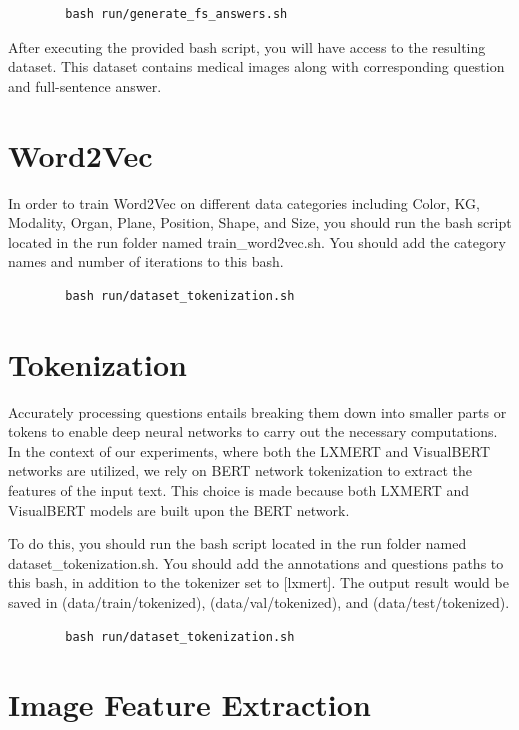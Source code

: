 \documentclass{adonis}
\begin{document}
        \begin{verbatim}
        bash run/generate_fs_answers.sh
        \end{verbatim}

        
  After executing the provided bash script, you will have access to the resulting dataset.  This dataset contains medical images along with corresponding question and full-sentence answer. 


\section{Word2Vec}
	
        In order to train Word2Vec on different data categories including Color, KG, Modality, Organ, Plane, Position, Shape, and Size, you should run the bash script located in the run folder named train\_word2vec.sh. You should add the category names and number of iterations to this bash. 
        \begin{verbatim}
        bash run/dataset_tokenization.sh
        \end{verbatim}

		
		\section{Tokenization}

        Accurately processing questions entails breaking them down into smaller parts or tokens to enable deep neural networks to carry out the necessary computations. In the context of our experiments, where both the LXMERT and VisualBERT networks are utilized, we rely on BERT network tokenization to extract the features of the input text. This choice is made because both LXMERT and VisualBERT models are built upon the BERT network.
	
        To do this, you should run the bash script located in the run folder named dataset\_tokenization.sh. You should add the annotations and questions paths to this bash, in addition to the tokenizer set to [lxmert]. The output result would be saved in (data/train/tokenized), (data/val/tokenized), and (data/test/tokenized).
        \begin{verbatim}
        bash run/dataset_tokenization.sh
        \end{verbatim}


        \section{Image Feature Extraction}
\end{document}
